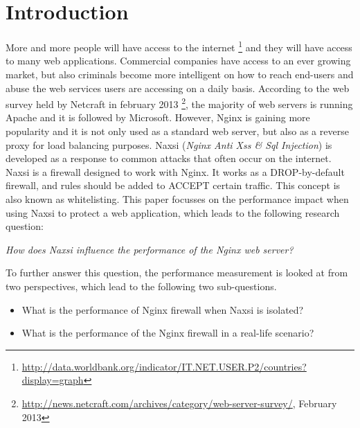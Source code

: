 \documentclass[Introduction]{subfiles}
\begin{document}
\section{Introduction}
\label{sec:Introduction}
More and more people will have access to the internet \footnote{\url{http://data.worldbank.org/indicator/IT.NET.USER.P2/countries?display=graph}} and they will have access to many web applications. Commercial companies have access to an ever growing market, but also criminals become more intelligent on how to reach end-users and abuse the web services users are accessing on a daily basis.
According to the web survey held by Netcraft in february 2013 \footnote{\url{http://news.netcraft.com/archives/category/web-server-survey/}, February 2013}, the majority of web servers is running Apache and it is followed by Microsoft. However, Nginx is gaining more popularity and it is not only used as a standard web server, but also as a reverse proxy for load balancing purposes. Naxsi (\emph{Nginx Anti Xss \& Sql Injection}) is developed as a response to common attacks that often occur on the internet. Naxsi is a firewall designed to work with Nginx. It works as a DROP-by-default firewall, and rules should be added to ACCEPT certain traffic. This concept is also known as whitelisting. This paper focusses on the performance impact when using Naxsi to protect a web application, which leads to the following research question:

\begin{center}
\emph{How does Naxsi influence the performance of the Nginx web server?} 
\end{center}

\noindent
To further answer this question, the performance measurement is looked at from two perspectives, which lead to the following two sub-questions.

\begin{itemize}
\item What is the performance of Nginx firewall
when Naxsi is isolated?
\item What is the performance of the Nginx firewall in a real-life scenario?
\end{itemize}

\end{document}
